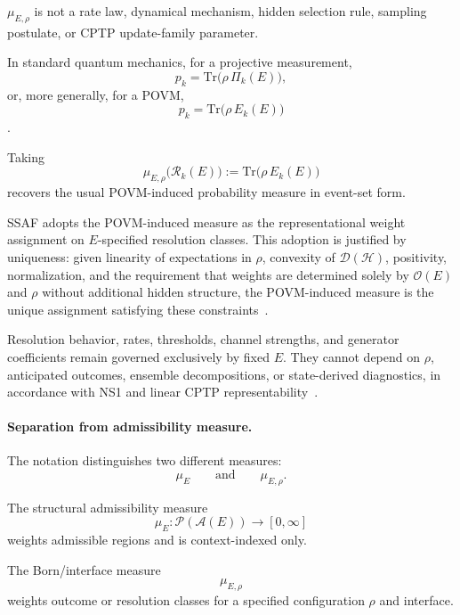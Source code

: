 \documentclass[aps,prx,onecolumn,11pt]{revtex4-2}
\theoremstyle{plain}
\theoremstyle{definition}
\theoremstyle{remark}
\begin{document}
\(\mu_{E,\rho}\) is not a rate law, dynamical mechanism, hidden
selection rule, sampling postulate, or CPTP update-family parameter.

In standard quantum mechanics, for a projective measurement,
\begin{equation}
p_k
=
\mathrm{Tr}\bigl(\rho\,\Pi_k(E)\bigr),
\label{eq:born_projective}
\end{equation}
or, more generally, for a POVM,
\begin{equation}
p_k
=
\mathrm{Tr}\bigl(\rho\,E_k(E)\bigr)
\label{eq:born_povm}
\end{equation}
\cite{Born1926,NielsenChuang2010,Watrous2018}.

Taking
\[
\mu_{E,\rho}\bigl(\mathcal{R}_k(E)\bigr)
:=
\mathrm{Tr}\bigl(\rho\,E_k(E)\bigr)
\]
recovers the usual POVM-induced probability measure in event-set form.

SSAF adopts the POVM-induced measure as the representational weight
assignment on \(E\)-specified resolution classes. This adoption is
justified by uniqueness: given linearity of expectations in \(\rho\),
convexity of \(\mathcal{D}(\mathcal{H})\), positivity, normalization,
and the requirement that weights are determined solely by
\(\mathcal{O}(E)\) and \(\rho\) without additional hidden structure, the
POVM-induced measure is the unique assignment satisfying these
constraints~\cite{Gleason1957,BuschLahtiMittelstaedt2003}.

Resolution behavior, rates, thresholds, channel strengths, and
generator coefficients remain governed exclusively by fixed \(E\). They
cannot depend on \(\rho\), anticipated outcomes, ensemble
decompositions, or state-derived diagnostics, in accordance with NS1 and
linear CPTP representability~\cite{Lindblad1976,Gorini1976,Gisin1989,
Gisin1990,Polchinski1991}.

\paragraph{Separation from admissibility measure.}

The notation distinguishes two different measures:
\[
\mu_E
\qquad
\text{and}
\qquad
\mu_{E,\rho}.
\]

The structural admissibility measure
\[
\mu_E:
\mathcal P(\mathcal A(E))
\to
[0,\infty]
\]
weights admissible regions and is context-indexed only.

The Born/interface measure
\[
\mu_{E,\rho}
\]
weights outcome or resolution classes for a specified configuration
\(\rho\) and interface.
\end{document}
